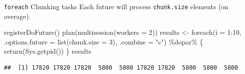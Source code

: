 \documentclass[
  ignorenonframetext,
  usenames,
  dvipsnames]{beamer}
\newenvironment{Shaded}{\begin{snugshade}}{\end{snugshade}}
\newcommand{\AttributeTok}[1]{\textcolor[rgb]{0.77,0.63,0.00}{#1}}
\newcommand{\DecValTok}[1]{\textcolor[rgb]{0.00,0.00,0.81}{#1}}
\newcommand{\FunctionTok}[1]{\textcolor[rgb]{0.00,0.00,0.00}{#1}}
\newcommand{\NormalTok}[1]{#1}
\newcommand{\OtherTok}[1]{\textcolor[rgb]{0.56,0.35,0.01}{#1}}
\newcommand{\SpecialCharTok}[1]{\textcolor[rgb]{0.00,0.00,0.00}{#1}}
\newcommand{\StringTok}[1]{\textcolor[rgb]{0.31,0.60,0.02}{#1}}
\begin{document}
\begin{frame}[fragile]{\texttt{foreach} Chunking tasks}
\protect\hypertarget{foreach-chunking-tasks}{}
Each future will process \texttt{chunk.size} elements (on average).
\small

\begin{Shaded}
\begin{Highlighting}[]
\FunctionTok{registerDoFuture}\NormalTok{()}
\FunctionTok{plan}\NormalTok{(}\FunctionTok{multisession}\NormalTok{(}\AttributeTok{workers =} \DecValTok{2}\NormalTok{))}
\NormalTok{results }\OtherTok{\textless{}{-}} \FunctionTok{foreach}\NormalTok{(}\AttributeTok{i =} \DecValTok{1}\SpecialCharTok{:}\DecValTok{10}\NormalTok{,}
                   \AttributeTok{.options.future =} \FunctionTok{list}\NormalTok{(}\AttributeTok{chunk.size =} \DecValTok{3}\NormalTok{),}
                   \AttributeTok{.combine =} \StringTok{"c"}\NormalTok{) }\SpecialCharTok{\%dopar\%}\NormalTok{ \{}
  \FunctionTok{return}\NormalTok{(}\FunctionTok{Sys.getpid}\NormalTok{())}
\NormalTok{\}}
\NormalTok{results}
\end{Highlighting}
\end{Shaded}

\begin{verbatim}
##  [1] 17820 17820 17820  5800  5800 17820 17820  5800  5800  5800
\end{verbatim}

\normalsize
\end{frame}
\end{document}
